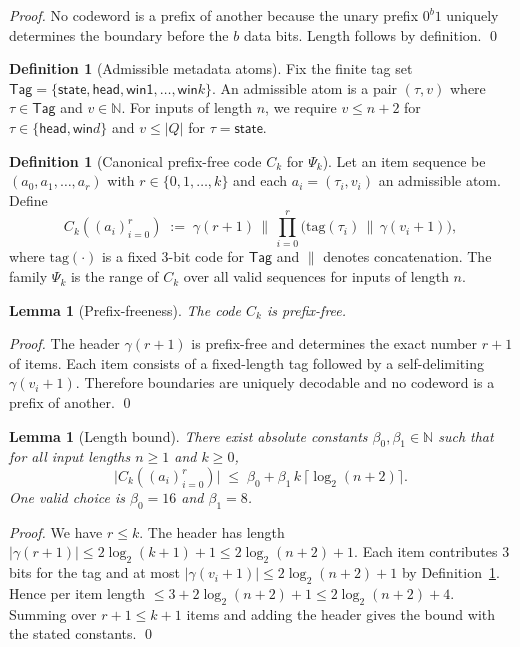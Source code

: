 \documentclass[11pt]{article}
\newtheorem{lemma}[theorem]{Lemma}
\theoremstyle{definition}
\newtheorem{definition}[theorem]{Definition}
\newcommand{\PSi}{\Psi}
\begin{document}
\begin{proof}
No codeword is a prefix of another because the unary prefix $0^{b}1$ uniquely determines the boundary before the $b$ data bits. Length follows by definition. \qed
\end{proof}

\begin{definition}[Admissible metadata atoms]
\label{def:atoms}
Fix the finite tag set $\mathsf{Tag}=\{\textsf{state},\textsf{head},\textsf{win1},\ldots,\textsf{win}k\}$. An admissible atom is a pair $(\tau, v)$ where $\tau\in\mathsf{Tag}$ and $v\in\mathbb{N}$. For inputs of length $n$, we require $v\le n+2$ for $\tau\in\{\textsf{head},\textsf{win}d\}$ and $v\le |Q|$ for $\tau=\textsf{state}$.
\end{definition}

\begin{definition}[Canonical prefix-free code $C_k$ for $\PSi_k$]
\label{def:psi-k}
Let an item sequence be $(a_0,a_1,\ldots,a_r)$ with $r\in\{0,1,\ldots,k\}$ and each $a_i=(\tau_i,v_i)$ an admissible atom. Define
\[
C_k((a_i)_{i=0}^r)\;:=\; \gamma(r+1)\,\big\|\,\prod_{i=0}^{r}\Big(\mathrm{tag}(\tau_i)\,\big\|\,\gamma(v_i+1)\Big),
\]
where $\mathrm{tag}(\cdot)$ is a fixed 3-bit code for $\mathsf{Tag}$ and $\|$ denotes concatenation. The family $\PSi_k$ is the range of $C_k$ over all valid sequences for inputs of length $n$.
\end{definition}

\begin{lemma}[Prefix-freeness]
\label{lem:prefixfree}
The code $C_k$ is prefix-free.
\end{lemma}

\begin{proof}
The header $\gamma(r+1)$ is prefix-free and determines the exact number $r+1$ of items. Each item consists of a fixed-length tag followed by a self-delimiting $\gamma(v_i+1)$. Therefore boundaries are uniquely decodable and no codeword is a prefix of another. \qed
\end{proof}

\begin{lemma}[Length bound]
\label{lem:length-bound}
There exist absolute constants $\beta_0,\beta_1\in\mathbb{N}$ such that for all input lengths $n\ge1$ and $k\ge0$,
\[
\big|C_k((a_i)_{i=0}^{r})\big|\;\le\; \beta_0 + \beta_1\,k\,\lceil\log_2(n+2)\rceil.
\]
One valid choice is $\beta_0=16$ and $\beta_1=8$.
\end{lemma}

\begin{proof}
We have $r\le k$. The header has length $|\gamma(r+1)|\le 2\log_2(k+1)+1\le 2\log_2(n+2)+1$. Each item contributes $3$ bits for the tag and at most $|\gamma(v_i+1)|\le 2\log_2(n+2)+1$ by Definition~\ref{def:atoms}. Hence per item length $\le 3+2\log_2(n+2)+1\le 2\log_2(n+2)+4$. Summing over $r+1\le k+1$ items and adding the header gives the bound with the stated constants. \qed
\end{proof}
\end{document}
